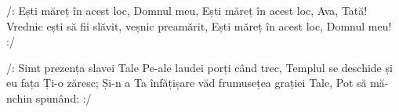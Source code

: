 \beginchorus
/: Ești măreț în acest loc, Domnul meu,
Ești măreț în acest loc, Ava, Tată!
Vrednic ești să fii slăvit, veșnic preamărit,
Ești măreț în acest loc, Domnul meu! :/
\endchorus

\beginverse
/: Simt prezența slavei Tale
Pe-ale laudei porți când trec,
Templul se deschide și eu fața Ți-o zăresc;
Și-n a Ta înfățișare văd frumusețea grației Tale,
Pot să mă-nchin spunând: :/
\endverse
\endsong